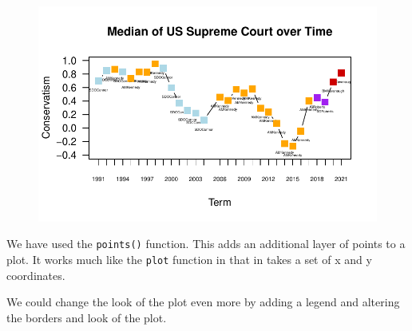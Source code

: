 \documentclass[
  letterpaper,
  DIV=11,
  numbers=noendperiod]{scrreprt}
\begin{document}
\begin{figure}[H]

{\centering \includegraphics{06-Loops_files/figure-pdf/unnamed-chunk-34-1.pdf}

}

\end{figure}

We have used the \texttt{points()} function. This adds an additional
layer of points to a plot. It works much like the \texttt{plot} function
in that in takes a set of x and y coordinates.

We could change the look of the plot even more by adding a legend and
altering the borders and look of the plot.
\end{document}
